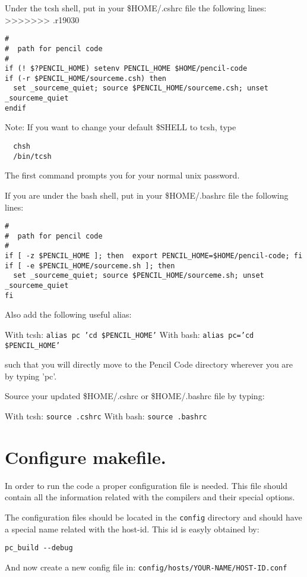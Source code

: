 \documentclass[a4paper,12pt]{article}
\begin{document}
Under the tcsh shell, put in your \$HOME/.cshrc file the following lines:
>>>>>>> .r19030
\begin{verbatim}
#
#  path for pencil code
#
if (! $?PENCIL_HOME) setenv PENCIL_HOME $HOME/pencil-code
if (-r $PENCIL_HOME/sourceme.csh) then
  set _sourceme_quiet; source $PENCIL_HOME/sourceme.csh; unset _sourceme_quiet
endif
\end{verbatim}

Note: If you want to change your default \$SHELL to tcsh, type

\begin{verbatim}
  chsh
  /bin/tcsh
\end{verbatim}

The first command prompts you for your normal unix password.

If you are under the bash shell, put in your \$HOME/.bashrc file the following
lines:
\begin{verbatim}
#
#  path for pencil code
#
if [ -z $PENCIL_HOME ]; then  export PENCIL_HOME=$HOME/pencil-code; fi
if [ -e $PENCIL_HOME/sourceme.sh ]; then
  set _sourceme_quiet; source $PENCIL_HOME/sourceme.sh; unset _sourceme_quiet
fi
\end{verbatim}

Also add the following useful alias:

With tcsh: \texttt{alias pc 'cd \$PENCIL\_HOME'}
With bash: \texttt{alias pc='cd \$PENCIL\_HOME'}

such that you will directly move to the Pencil Code directory wherever you are
by typing 'pc'.

Source your updated \$HOME/.cshrc or \$HOME/.bashrc file by typing:

With tcsh: \texttt{source .cshrc}
With bash: \texttt{source .bashrc}

\section{Configure makefile.}

In order to run the code a proper configuration file is needed. This file should contain all the information related with the compilers and their special options.

The configuration files should be located in the \verb|config| directory and should have a special name related with the host-id. This id is easyly obtained by:  
\begin{verbatim}
pc_build --debug
\end{verbatim}
And now create a new config file in:
\texttt{config/hosts/YOUR-NAME/HOST-ID.conf}
\end{document}
